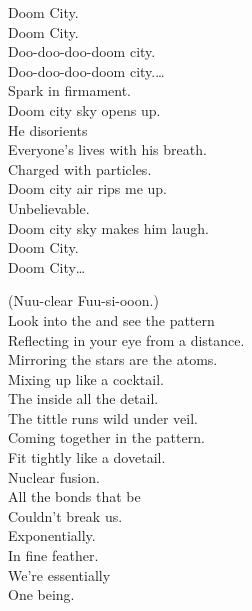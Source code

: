 Doom City. \\
Doom City. \\

Doo-doo-doo-doom city. \\
Doo-doo-doo-doom city.… \\

Spark in firmament. \\
Doom city sky opens up. \\
He disorients \\
Everyone's lives with his breath. \\
Charged with particles. \\
Doom city air rips me up. \\
Unbelievable. \\
Doom city sky makes him laugh. \\

Doom City. \\
Doom City… \\





(Nuu-clear Fuu-si-ooon.) \\

Look into the  and see the pattern \\
Reflecting in your eye from a distance. \\
Mirroring the stars are the atoms. \\
Mixing up like a cocktail. \\

The  inside all the detail. \\
The tittle runs wild under veil. \\
Coming together in the pattern. \\
Fit tightly like a dovetail. \\

Nuclear fusion. \\

All the bonds that be \\
Couldn't break us. \\
Exponentially. \\
In fine feather. \\
We're essentially \\
One being. \\

